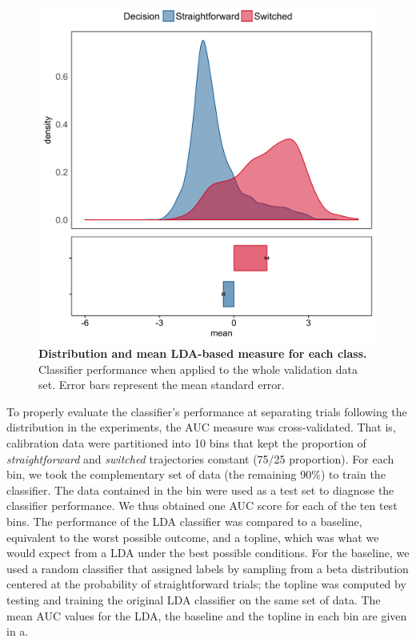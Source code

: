 \documentclass[11pt]{article}
\begin{document}
\begin{figure}
\centering
\includegraphics[width=.8\textwidth]{lda_distribution_calibration.png}
\caption{\textbf{Distribution and mean LDA-based measure for each class.} Classifier performance when applied to the whole validation data set. Error bars represent the mean standard error.} \label{DIST:LDA}
\end{figure}

To properly evaluate the classifier's performance at separating trials following the distribution in the experiments, the AUC measure was cross-validated. That is, calibration data were partitioned into 10 bins that kept the proportion of \textit{straightforward} and \textit{switched} trajectories constant (75/25 proportion). For each bin, we took the complementary set of data (the remaining 90\%) to train the classifier. The data contained in the bin were used as a test set to diagnose the classifier performance. We thus obtained one AUC score for each of the ten test bins. The performance of the LDA classifier was compared to a baseline, equivalent to the worst possible outcome, and a topline, which was what we would expect from a LDA under the best possible conditions. 
For the baseline, we used a random classifier that assigned labels by sampling from a beta distribution centered at the probability of straightforward trials; the topline was computed by testing and training the original LDA classifier on the same set of data. 
The mean AUC values for the LDA, the baseline and the topline in each bin are given in a. 
\end{document}
